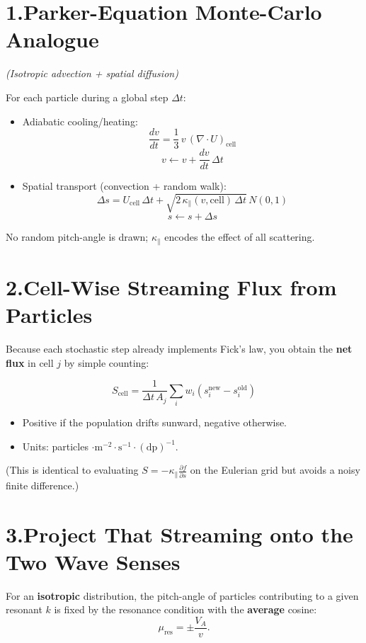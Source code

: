 \section*{1.\quad Parker-Equation Monte-Carlo Analogue}

\textit{(Isotropic advection + spatial diffusion)}

For each particle during a global step $\Delta t$:

\begin{itemize}
\item Adiabatic cooling/heating:
\[
\frac{dv}{dt} = \frac{1}{3} \, v \, (\nabla \cdot U)_{\text{cell}}
\]
\[
v \leftarrow v + \frac{dv}{dt} \, \Delta t
\]
\item Spatial transport (convection + random walk):
\[
\Delta s = U_{\text{cell}} \, \Delta t + \sqrt{2 \, \kappa_\parallel(v, \text{cell}) \, \Delta t} \, N(0,1)
\]
\[
s \leftarrow s + \Delta s
\]
\end{itemize}

No random pitch-angle is drawn; $\kappa_\parallel$ encodes the effect of all scattering.

\section*{2.\quad Cell-Wise Streaming Flux from Particles}

Because each stochastic step already implements Fick’s law, you obtain the \textbf{net flux} in cell $j$ by simple counting:

\[
S_{\text{cell}} = \frac{1}{\Delta t \, A_j} \sum_i w_i (s_i^{\text{new}} - s_i^{\text{old}})
\]

\begin{itemize}
\item Positive if the population drifts sunward, negative otherwise.
\item Units: particles $\cdot \text{m}^{-2} \cdot \text{s}^{-1} \cdot (\text{dp})^{-1}$.
\end{itemize}

(This is identical to evaluating $S = -\kappa_\parallel \frac{\partial f}{\partial s}$ on the Eulerian grid but avoids a noisy finite difference.)

\section*{3.\quad Project That Streaming onto the Two Wave Senses}

For an \textbf{isotropic} distribution, the pitch-angle of particles contributing to a given resonant $k$ is fixed by the resonance condition with the \textbf{average} cosine:
\[
\mu_{\text{res}} = \pm \frac{V_A}{v}.
\tag{1}
\]

